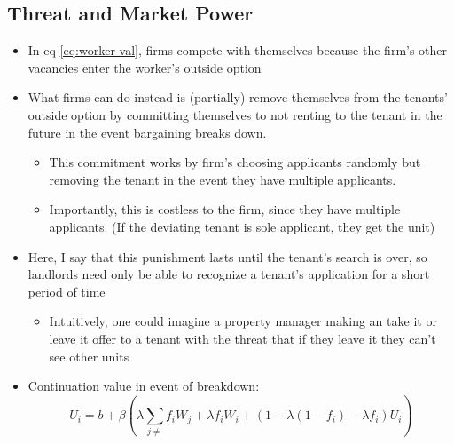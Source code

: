 \documentclass{article}
\begin{document}
\subsection{Threat and Market Power}
\begin{itemize}
    \item In eq \ref{eq:worker-val}, firms compete with themselves because the firm's other vacancies enter the worker's outside option
    \item What firms can do instead is (partially) remove themselves from the tenants' outside option by committing themselves to not renting to the tenant in the future in the event bargaining breaks down.
    \begin{itemize}
        \item This commitment works by firm's choosing applicants randomly but removing the tenant in the event they have multiple applicants.
        \item Importantly, this is costless to the firm, since they have multiple applicants. (If the deviating tenant is sole applicant, they get the unit)
    \end{itemize}
    \item Here, I say that this punishment lasts until the tenant's search is over, so landlords need only be able to recognize a tenant's application for a short period of time
    \begin{itemize}
        \item Intuitively, one could imagine a property manager making an take it or leave it offer to a tenant with the threat that if they leave it they can't see other units
    \end{itemize}
    \item Continuation value in event of breakdown:
    \begin{equation}\label{eq:match-val}
        U_i = b + \beta \left(\lambda\sum_{j\neq}f_iW_j + \lambda f_iW_i + (1-\lambda(1-f_i) - \lambda f_i)U_i\right)
    \end{equation}
\end{itemize}
\end{document}
